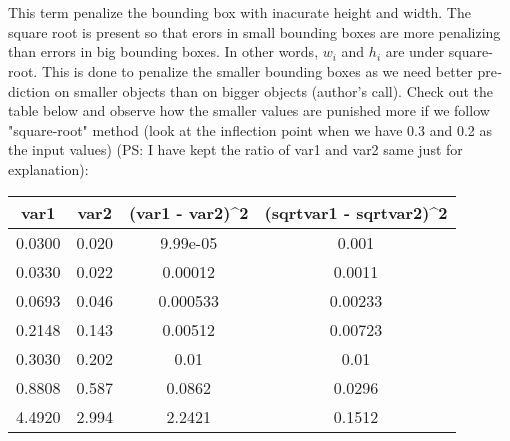 \documentclass{article}
\begin{document}
\section{}
\begin{latin}
This term penalize the bounding box with inacurate height and width. The square root is present so that erors in small bounding boxes are more penalizing than errors in big bounding boxes. In other words, $w_i$ and $h_i$ are under square-root. This is done to penalize the smaller bounding boxes as we need better prediction on smaller objects than on bigger objects (author's call). Check out the table below and observe how the smaller values are punished more if we follow "square-root" method (look at the inflection point when we have 0.3 and 0.2 as the input values) (PS: I have kept the ratio of var1 and var2 same just for explanation):

\begin{table}[H]
\begin{tabular}{|c|c|c|c|}
\hline
\textbf{var1} & \textbf{var2} & \textbf{(var1 - var2)\textasciicircum{}2} & \textbf{(sqrtvar1 - sqrtvar2)\textasciicircum{}2} \\ \hline
0.0300        & 0.020         & 9.99e-05                                  & 0.001                                             \\ \hline
0.0330        & 0.022         & 0.00012                                   & 0.0011                                            \\ \hline
0.0693        & 0.046         & 0.000533                                  & 0.00233                                           \\ \hline
0.2148        & 0.143         & 0.00512                                   & 0.00723                                           \\ \hline
0.3030        & 0.202         & 0.01                                      & 0.01                                              \\ \hline
0.8808        & 0.587         & 0.0862                                    & 0.0296                                            \\ \hline
4.4920        & 2.994         & 2.2421                                    & 0.1512                                            \\ \hline
\end{tabular}
\end{table}
\end{latin}
\end{document}
